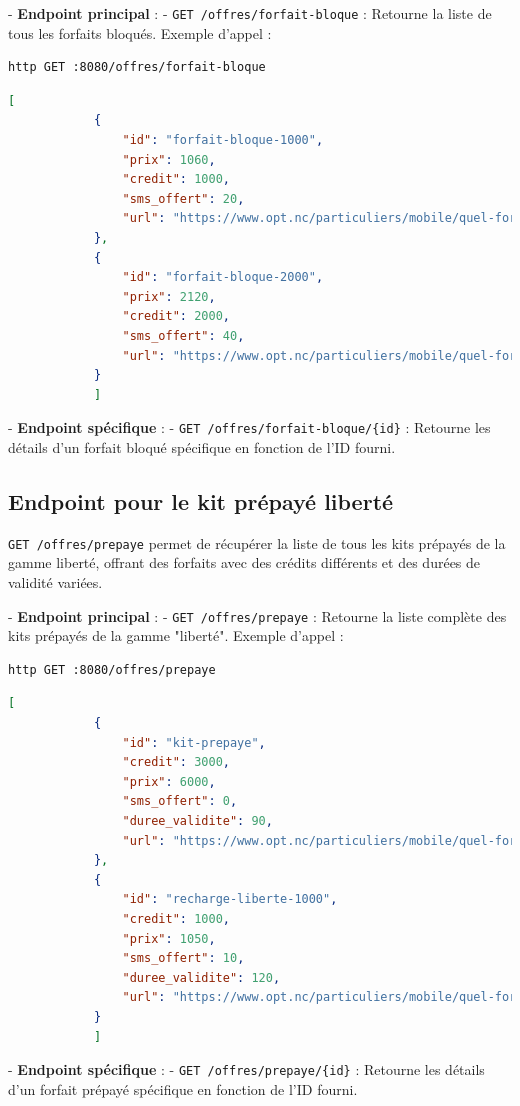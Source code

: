 \documentclass[11pt]{article}
\begin{document}
		- \textbf{Endpoint principal} :
		- \texttt{GET /offres/forfait-bloque} : Retourne la liste de tous les forfaits bloqués.
		Exemple d'appel :
		\begin{lstlisting}[language=bash]
			http GET :8080/offres/forfait-bloque
		\end{lstlisting}
		\begin{lstlisting}[language=JSON]
			[
			{
				"id": "forfait-bloque-1000",
				"prix": 1060,
				"credit": 1000,
				"sms_offert": 20,
				"url": "https://www.opt.nc/particuliers/mobile/quel-forfait-choisir/forfait-bloque-1000"
			},
			{
				"id": "forfait-bloque-2000",
				"prix": 2120,
				"credit": 2000,
				"sms_offert": 40,
				"url": "https://www.opt.nc/particuliers/mobile/quel-forfait-choisir/forfait-bloque-2000"
			}
			]
		\end{lstlisting}
		
		- \textbf{Endpoint spécifique} :
		- \texttt{GET /offres/forfait-bloque/\{id\}} : Retourne les détails d'un forfait bloqué spécifique en fonction de l'ID fourni.
		
		\subsection*{Endpoint pour le kit prépayé liberté}
		\texttt{GET /offres/prepaye} permet de récupérer la liste de tous les kits prépayés de la gamme liberté, offrant des forfaits avec des crédits différents et des durées de validité variées.
		
		- \textbf{Endpoint principal} :
		- \texttt{GET /offres/prepaye} : Retourne la liste complète des kits prépayés de la gamme "liberté".
		Exemple d'appel :
		\begin{lstlisting}[language=bash]
			http GET :8080/offres/prepaye
		\end{lstlisting}
		\begin{lstlisting}[language=JSON]
			[
			{
				"id": "kit-prepaye",
				"credit": 3000,
				"prix": 6000,
				"sms_offert": 0,
				"duree_validite": 90,
				"url": "https://www.opt.nc/particuliers/mobile/quel-forfait-choisir/kit-prepaye-liberte"
			},
			{
				"id": "recharge-liberte-1000",
				"credit": 1000,
				"prix": 1050,
				"sms_offert": 10,
				"duree_validite": 120,
				"url": "https://www.opt.nc/particuliers/mobile/quel-forfait-choisir/kit-prepaye-liberte"
			}
			]
		\end{lstlisting}
		
		- \textbf{Endpoint spécifique} :
		- \texttt{GET /offres/prepaye/\{id\}} : Retourne les détails d'un forfait prépayé spécifique en fonction de l'ID fourni.
\end{document}
